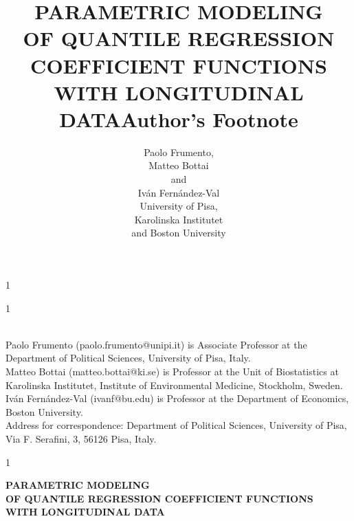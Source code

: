 \documentclass[12pt]{article}
\newcommand{\blind}{1}
\begin{document}
%

\def\spacingset#1{\renewcommand{\baselinestretch}%
{#1}\small\normalsize} \spacingset{1}



\blind
{
  \title{\bf PARAMETRIC MODELING\\ OF QUANTILE REGRESSION COEFFICIENT FUNCTIONS\\ WITH LONGITUDINAL DATA}
  \author{Paolo Frumento,  \vspace{.2cm}\\
    Matteo Bottai \vspace{0.2cm} \\
    and  \vspace{0.2cm} \\
    Iv\'an Fern\'andez-Val \vspace{0.5cm} \\
    University of Pisa, \\
    Karolinska Institutet\\
    and Boston University}
  \maketitle
} \fi


\blind
{
  \newpage
  \title{\bf Author's Footnote} \vspace{1 cm}\\
  Paolo Frumento (paolo.frumento@unipi.it) is Associate Professor at the Department of Political Sciences, University of Pisa, Italy.\vspace{0.5 cm}\\
  Matteo Bottai (matteo.bottai@ki.se) is Professor at the Unit of Biostatistics at Karolinska Institutet, Institute of Environmental Medicine, Stockholm, Sweden.\vspace{0.5 cm}\\
  Iv\'an Fern\'andez-Val (ivanf@bu.edu) is Professor at the Department of Economics, Boston University.\vspace{0.5 cm}\\
  Address for correspondence: Department of Political Sciences, University of Pisa, Via F. Serafini, 3, 56126 Pisa, Italy.
  \newpage
} \fi


\blind
{
  \bigskip
  \bigskip
  \bigskip
  \begin{center}
    {\LARGE \bf PARAMETRIC MODELING \\ OF QUANTILE REGRESSION COEFFICIENT FUNCTIONS \vspace{0.3cm} \\ WITH LONGITUDINAL DATA}
\end{center}
  \medskip
} \fi
\end{document}

